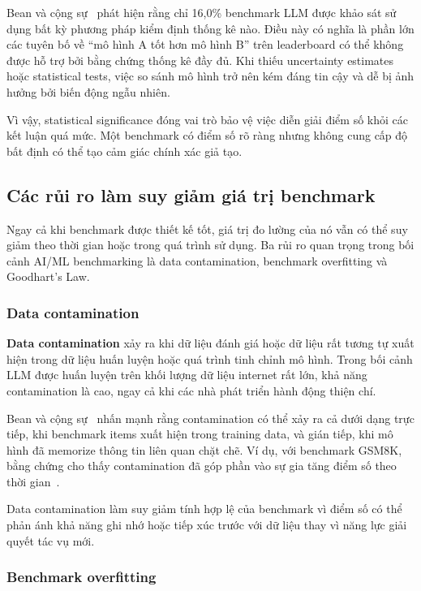 Bean và cộng sự~\cite{measuring_what_matters} phát hiện rằng chỉ 16,0\% benchmark LLM được khảo sát sử dụng bất kỳ phương pháp kiểm định thống kê nào. Điều này có nghĩa là phần lớn các tuyên bố về ``mô hình A tốt hơn mô hình B'' trên leaderboard có thể không được hỗ trợ bởi bằng chứng thống kê đầy đủ. Khi thiếu uncertainty estimates hoặc statistical tests, việc so sánh mô hình trở nên kém đáng tin cậy và dễ bị ảnh hưởng bởi biến động ngẫu nhiên.

Vì vậy, statistical significance đóng vai trò bảo vệ việc diễn giải điểm số khỏi các kết luận quá mức. Một benchmark có điểm số rõ ràng nhưng không cung cấp độ bất định có thể tạo cảm giác chính xác giả tạo.

\subsection{Các rủi ro làm suy giảm giá trị benchmark}
\label{sec:benchmark_risks}

Ngay cả khi benchmark được thiết kế tốt, giá trị đo lường của nó vẫn có thể suy giảm theo thời gian hoặc trong quá trình sử dụng. Ba rủi ro quan trọng trong bối cảnh AI/ML benchmarking là data contamination, benchmark overfitting và Goodhart's Law.

\subsubsection{Data contamination}
\label{sec:data_contamination}

\textbf{Data contamination} xảy ra khi dữ liệu đánh giá hoặc dữ liệu rất tương tự xuất hiện trong dữ liệu huấn luyện hoặc quá trình tinh chỉnh mô hình. Trong bối cảnh LLM được huấn luyện trên khối lượng dữ liệu internet rất lớn, khả năng contamination là cao, ngay cả khi các nhà phát triển hành động thiện chí.

Bean và cộng sự~\cite{measuring_what_matters} nhấn mạnh rằng contamination có thể xảy ra cả dưới dạng trực tiếp, khi benchmark items xuất hiện trong training data, và gián tiếp, khi mô hình đã memorize thông tin liên quan chặt chẽ. Ví dụ, với benchmark GSM8K, bằng chứng cho thấy contamination đã góp phần vào sự gia tăng điểm số theo thời gian~\cite{measuring_what_matters}.

Data contamination làm suy giảm tính hợp lệ của benchmark vì điểm số có thể phản ánh khả năng ghi nhớ hoặc tiếp xúc trước với dữ liệu thay vì năng lực giải quyết tác vụ mới.

\subsubsection{Benchmark overfitting}
\label{sec:benchmark_overfitting}

